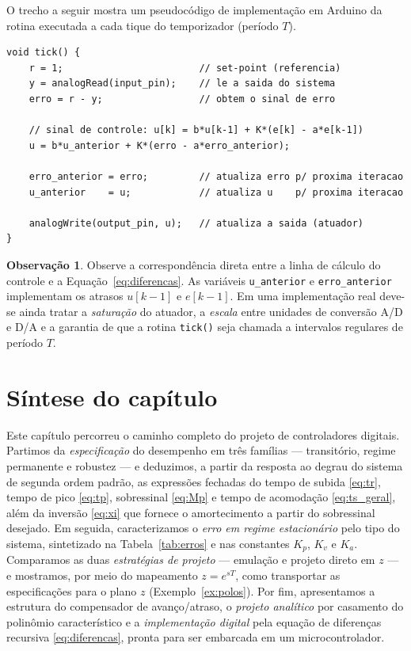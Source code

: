 \documentclass[11pt,a4paper,oneside]{book}
\theoremstyle{definition}
\newtheorem{observacao}{Observação}[chapter]
\theoremstyle{plain}
\begin{document}
O trecho a seguir mostra um pseudocódigo de implementação em Arduino da
rotina executada a cada tique do temporizador (período $T$).

\begin{lstlisting}[style=arduino,caption={Pseudocódigo de implementação da equação de diferenças em Arduino.},captionpos=b]
void tick() {
    r = 1;                        // set-point (referencia)
    y = analogRead(input_pin);    // le a saida do sistema
    erro = r - y;                 // obtem o sinal de erro

    // sinal de controle: u[k] = b*u[k-1] + K*(e[k] - a*e[k-1])
    u = b*u_anterior + K*(erro - a*erro_anterior);

    erro_anterior = erro;         // atualiza erro p/ proxima iteracao
    u_anterior    = u;            // atualiza u    p/ proxima iteracao

    analogWrite(output_pin, u);   // atualiza a saida (atuador)
}
\end{lstlisting}

\begin{observacao}
Observe a correspondência direta entre a linha de cálculo do controle e a
Equação~\eqref{eq:diferencas}. As variáveis \texttt{u\_anterior} e
\texttt{erro\_anterior} implementam os atrasos $u[k-1]$ e $e[k-1]$. Em uma
implementação real deve-se ainda tratar a \emph{saturação} do atuador, a
\emph{escala} entre unidades de conversão A/D e D/A e a garantia de que a rotina
\texttt{tick()} seja chamada a intervalos regulares de período $T$.
\end{observacao}

\section*{Síntese do capítulo}

Este capítulo percorreu o caminho completo do projeto de controladores digitais.
Partimos da \emph{especificação} do desempenho em três famílias --- transitório,
regime permanente e robustez --- e deduzimos, a partir da resposta ao degrau do
sistema de segunda ordem padrão, as expressões fechadas do tempo de subida
\eqref{eq:tr}, tempo de pico \eqref{eq:tp}, sobressinal \eqref{eq:Mp} e tempo de
acomodação \eqref{eq:ts_geral}, além da inversão \eqref{eq:xi} que fornece o
amortecimento a partir do sobressinal desejado. Em seguida, caracterizamos o
\emph{erro em regime estacionário} pelo tipo do sistema, sintetizado na
Tabela~\ref{tab:erros} e nas constantes $K_p$, $K_v$ e $K_a$. Comparamos as duas
\emph{estratégias de projeto} --- emulação e projeto direto em $z$ --- e
mostramos, por meio do mapeamento $z=e^{sT}$, como transportar as especificações
para o plano $z$ (Exemplo~\ref{ex:polos}). Por fim, apresentamos a estrutura do
compensador de avanço/atraso, o \emph{projeto analítico} por casamento do
polinômio característico e a \emph{implementação digital} pela equação de
diferenças recursiva \eqref{eq:diferencas}, pronta para ser embarcada em um
microcontrolador.
\end{document}
